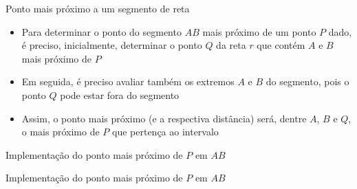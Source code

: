 \begin{frame}[fragile]{Ponto mais próximo a um segmento de reta}

    \begin{itemize}
        \item Para determinar o ponto do segmento $AB$ mais próximo de um ponto $P$ dado, é
            preciso, inicialmente, determinar o ponto $Q$ da reta $r$ que contém $A$ e $B$ mais
            próximo de $P$
        \pause

        \item Em seguida, é preciso avaliar também os extremos $A$ e $B$ do segmento, pois o ponto
            $Q$ pode estar fora do segmento
        \pause

        \item Assim, o ponto mais próximo (e a respectiva distância) será, dentre $A$, $B$ e $Q$,
            o mais próximo de $P$ que pertença ao intervalo

    \end{itemize}

\end{frame}

\begin{frame}[fragile]{Implementação do ponto mais próximo de $P$ em $AB$}
\end{frame}

\begin{frame}[fragile]{Implementação do ponto mais próximo de $P$ em $AB$}
\end{frame}
